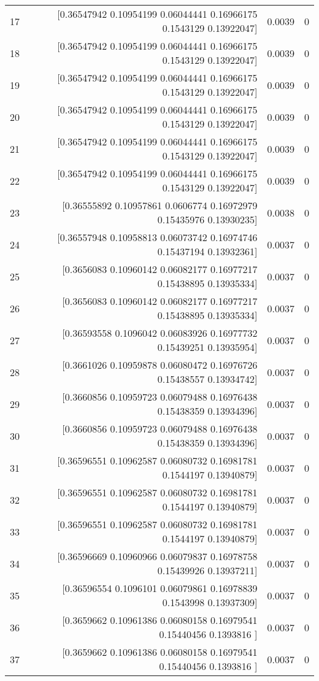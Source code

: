 \begin{longtable}{lrrr}
17 & [0.36547942 0.10954199 0.06044441 0.16966175 0.1543129  0.13922047] & 0.0039 & 0 \\
18 & [0.36547942 0.10954199 0.06044441 0.16966175 0.1543129  0.13922047] & 0.0039 & 0 \\
19 & [0.36547942 0.10954199 0.06044441 0.16966175 0.1543129  0.13922047] & 0.0039 & 0 \\
20 & [0.36547942 0.10954199 0.06044441 0.16966175 0.1543129  0.13922047] & 0.0039 & 0 \\
21 & [0.36547942 0.10954199 0.06044441 0.16966175 0.1543129  0.13922047] & 0.0039 & 0 \\
22 & [0.36547942 0.10954199 0.06044441 0.16966175 0.1543129  0.13922047] & 0.0039 & 0 \\
23 & [0.36555892 0.10957861 0.0606774  0.16972979 0.15435976 0.13930235] & 0.0038 & 0 \\
24 & [0.36557948 0.10958813 0.06073742 0.16974746 0.15437194 0.13932361] & 0.0037 & 0 \\
25 & [0.3656083  0.10960142 0.06082177 0.16977217 0.15438895 0.13935334] & 0.0037 & 0 \\
26 & [0.3656083  0.10960142 0.06082177 0.16977217 0.15438895 0.13935334] & 0.0037 & 0 \\
27 & [0.36593558 0.1096042  0.06083926 0.16977732 0.15439251 0.13935954] & 0.0037 & 0 \\
28 & [0.3661026  0.10959878 0.06080472 0.16976726 0.15438557 0.13934742] & 0.0037 & 0 \\
29 & [0.3660856  0.10959723 0.06079488 0.16976438 0.15438359 0.13934396] & 0.0037 & 0 \\
30 & [0.3660856  0.10959723 0.06079488 0.16976438 0.15438359 0.13934396] & 0.0037 & 0 \\
31 & [0.36596551 0.10962587 0.06080732 0.16981781 0.1544197  0.13940879] & 0.0037 & 0 \\
32 & [0.36596551 0.10962587 0.06080732 0.16981781 0.1544197  0.13940879] & 0.0037 & 0 \\
33 & [0.36596551 0.10962587 0.06080732 0.16981781 0.1544197  0.13940879] & 0.0037 & 0 \\
34 & [0.36596669 0.10960966 0.06079837 0.16978758 0.15439926 0.13937211] & 0.0037 & 0 \\
35 & [0.36596554 0.1096101  0.06079861 0.16978839 0.1543998  0.13937309] & 0.0037 & 0 \\
36 & [0.3659662  0.10961386 0.06080158 0.16979541 0.15440456 0.1393816 ] & 0.0037 & 0 \\
37 & [0.3659662  0.10961386 0.06080158 0.16979541 0.15440456 0.1393816 ] & 0.0037 & 0 \\

\end{longtable}
